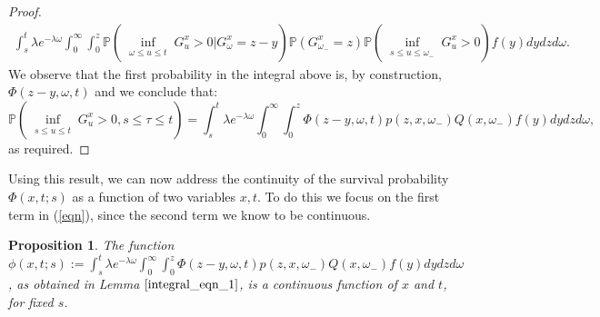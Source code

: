 \documentclass[11pt,reqno]{article}
\newtheorem{proposition}[theorem]{Proposition}
\theoremstyle{definition}
\begin{document}
\begin{proof}
	\begin{eqnarray}
		\int_{s}^{t} \lambda e^{-\lambda \omega} \int_{0}^{\infty} \int_{0}^{z} \mathbb{P}(\inf_{\substack{\omega \leq u \leq t}}G_u^x >0| G_{\omega}^x =z-y) \mathbb{P}(G_{\omega_-}^x=z) \mathbb{P}(\inf_{\substack{s \leq u \leq \omega_-}}G_u^x >0)  f(y)dydzd\omega.
	\end{eqnarray}
	We observe that the first probability in the integral above is, by construction, $\Phi(z-y,\omega,t)$ and we conclude that:
	$$\mathbb{P}(\inf_{\substack{s \leq u \leq t}}G_u^x >0 , s \leq \tau \leq t) = \int_{s}^{t} \lambda e^{-\lambda \omega} \int_{0}^{\infty} \int_{0}^{z} \Phi(z-y,\omega,t) p(z,x,\omega_-) Q(x,\omega_-)f(y)dydzd\omega, $$ as required.
\end{proof}

Using this result, we can now address the continuity of the survival probability $\Phi(x,t;s)$ as a function of two variables $x,t$. To do this we focus on the first term in (\ref{eqn}), since the second term we know to be continuous. 

\begin{proposition}\label{cont2}
	The function $\phi(x,t;s):= \int_{s}^{t} \lambda e^{-\lambda \omega} \int_{0}^{\infty} \int_{0}^{z} \Phi(z-y,\omega,t) p(z,x,\omega_-) Q(x,\omega_-)f(y)dydzd\omega$, as obtained in Lemma $\ref{integral_eqn_1}$, is a continuous function of $x$ and $t$, for fixed $s$.
\end{proposition}
\end{document}
